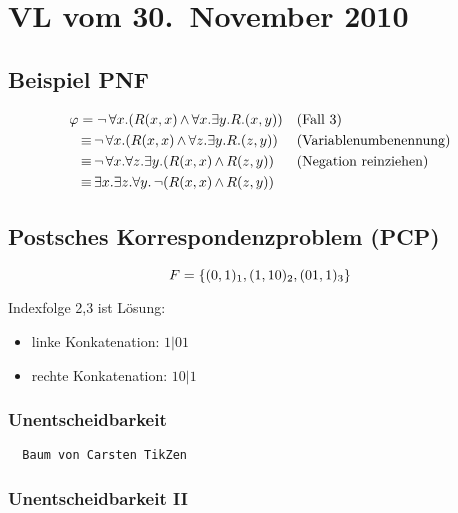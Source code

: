 \section{VL vom 30.~November 2010}

\subsection{Beispiel PNF}

\begin{align}
  \varphi &= \operatorname{\neg}\forall x.(R(x,x) \operatorname{\wedge} \forall x.\exists y.R.(x,y)) && \text{(Fall 3)} \\
    &\operatorname{\equiv} \operatorname{\neg}\forall x.(R(x,x) \operatorname{\wedge} \forall z.\exists y.R.(z,y)) && \text{(Variablenumbenennung)} \\
    &\operatorname{\equiv} \operatorname{\neg}\forall x.\forall z.\exists y.(R(x,x) \operatorname{\wedge} R(z,y)) && \text{(Negation reinziehen)} \\
    &\operatorname{\equiv} \exists x.\exists z.\forall y. \operatorname{\neg}(R(x,x) \operatorname{\wedge} R(z,y))
\end{align}

\subsection{Postsches Korrespondenzproblem (PCP)}

\[
  F = \left\{(0,1)_1, (1,10)_2, (01,1)_3\right\}
\]

Indexfolge 2,3 ist Lösung:

\begin{itemize}
  \item linke Konkatenation:  $1|0 1$
  \item rechte Konkatenation: $1 0|1$
\end{itemize}

\subsubsection{Unentscheidbarkeit}

\begin{verbatim}
  Baum von Carsten TikZen
\end{verbatim}

\subsubsection{Unentscheidbarkeit II}


